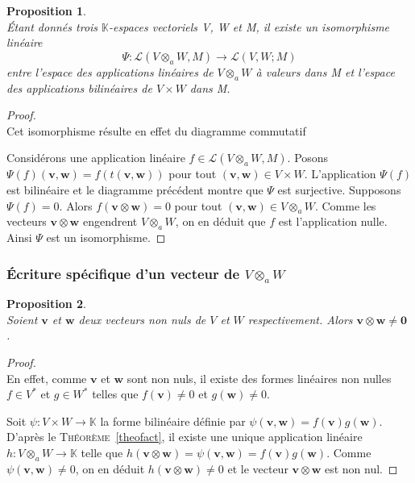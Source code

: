 \documentclass[11pt,a4paper,oneside]{book}
\newtheorem{prop}{Proposition}[chapter]
\newtheorem{proof}{Démonstration}
\def\K{\mathbb K}
\def\L{\mathcal L}
\def\ov{\mathbf 0}
\def\at{\otimes_{a}}
\def\v{\mathbf v}
\def\w{\mathbf w}
\newcommand{\theoref}[1]{\textsc{Théorème}~\ref{#1}}
\begin{document}
\begin{prop}\label{rem:1}
\emph{\\}
Étant donnés trois $ \K$-espaces vectoriels V, W et M, il existe un isomorphisme linéaire $$\Psi:\L(V\otimes_{a} W, M) \rightarrow \L(V,W;M)$$ entre l'espace des applications linéaires de $ V\otimes_{a} W $ à valeurs dans M et l'espace des applications bilinéaires de $ V\times W $ dans M. %
\end{prop}
\begin{proof}
\emph{\\}
Cet isomorphisme résulte en effet du diagramme commutatif 		\begin{center}
\end{center}
Considérons une application linéaire $ f\in\L(V\otimes_{a} W, M) .$ Posons $ \Psi(f)(\v,\w)=f(t(\v,\w)) $ pour tout $ (\v,\w)\in V\times W $. L'application $ \Psi(f) $ est bilinéaire et le diagramme précédent montre que $ \Psi $ est surjective. Supposons $ \Psi(f)=0 $. Alors $ f(\v\otimes \w)=0 $ pour tout $ (\v,\w)\in V\otimes_{a} W $. Comme les vecteurs $ \v\otimes \w $ engendrent $ V\otimes_{a} W $, on en déduit que $ f $ est l'application nulle. Ainsi $ \Psi $ est un isomorphisme.
\end{proof}

\subsubsection{Écriture  spécifique d'un vecteur de $ V\otimes_{a} W $ }
\begin{prop}
\emph{\\}
Soient $ \v $ et $ \w $ deux vecteurs non nuls de $ V $ et $ W $ respectivement. Alors $ \v\otimes\w\neq \ov $ \cite[p.104]{Michel2013}.
\end{prop}

\begin{proof}
\emph{\\}
En effet, comme $ \v $ et $ \w $ sont non nuls, il existe des formes linéaires non nulles $ f\in V^{*}$ et $ g\in W^{*} $ telles que $ f(\v)\neq 0 $ et $ g(\w)\neq 0 $.

Soit $ \psi:V\times W\rightarrow\K $ la forme bilinéaire définie par $ \psi(\v,\w)=f(\v)g(\w) $. D'après le \theoref{theofact}, il existe une unique application linéaire $ h:V\at W\rightarrow\K $ telle que $ h(\v\otimes\w)=\psi(\v,\w)=f(\v)g(\w) $. Comme $ \psi(\v,\w)\neq 0 $, on en déduit $ h(\v\otimes\w)\neq0 $ et le vecteur $ \v\otimes\w $ est non nul.
\end{proof}
\end{document}
